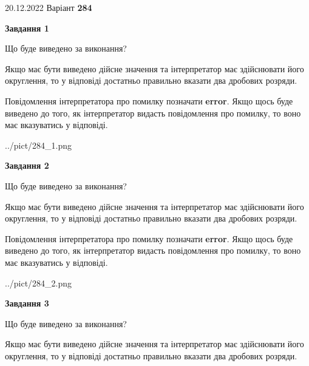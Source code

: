 \documentclass[12pt, ukrainian]{article}
\begin{document}
{20.12.2022 Варіант \No \textbf { 284 }\par}
{
\begin {Large}

{\begin {center}\textbf{Завдання 1}\end {center}}\par
Що буде виведено за виконання? \par

Якщо має бути виведено дійсне значення та інтерпретатор має здійснювати його округлення, 
то у відповіді достатньо правильно вказати два дробових розряди.

Повідомлення інтерпретатора про помилку позначати \textbf{error}.
Якщо щось буде виведено до того, як інтерпретатор видасть повідомлення про помилку, 
то воно має вказуватись у відповіді. \par

\begin{center}
	{../pict/284_1.png}
\end{center}
\newpage

{\begin {center}\textbf{Завдання 2}\end {center}}\par
Що буде виведено за виконання? \par

Якщо має бути виведено дійсне значення та інтерпретатор має здійснювати його округлення, 
то у відповіді достатньо правильно вказати два дробових розряди.

Повідомлення інтерпретатора про помилку позначати \textbf{error}.
Якщо щось буде виведено до того, як інтерпретатор видасть повідомлення про помилку, 
то воно має вказуватись у відповіді. \par

\begin{center}
	{../pict/284_2.png}
\end{center}
\newpage

{\begin {center}\textbf{Завдання 3}\end {center}}\par
Що буде виведено за виконання? \par

Якщо має бути виведено дійсне значення та інтерпретатор має здійснювати його округлення, 
то у відповіді достатньо правильно вказати два дробових розряди.


\end{Large}}
\end{document}
